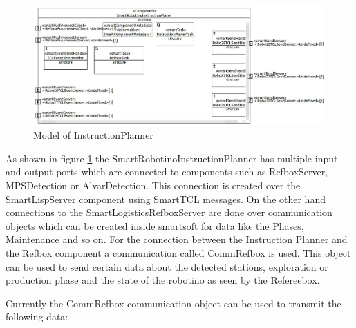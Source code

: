 \begin{figure}[h]
\centering
\includegraphics[scale=0.25]{pic/SmartRobotinoInstructionPlaner.JPG}
\caption{Model of InstructionPlanner}
\label{fig:i_overview}
\end{figure}


As shown in figure \ref{fig:i_overview} the SmartRobotinoInstructionPlanner has multiple input and output ports which are connected to components such as RefboxServer, MPSDetection or AlvarDetection. This connection is created over the SmartLispServer component using SmartTCL messages. On the other hand connections to the SmartLogisticsRefboxServer are done over communication objects which can be created inside smartsoft for data like the Phases, Maintenance and so on. For the connection between the Instruction Planner and the Refbox component a communication called CommRefbox is used. This object can be used to send certain data about the detected stations, exploration or production phase and the state of the robotino as seen by the 
Refereebox. \\

\newpage

Currently the CommRefbox communication object can be used to transmit the following data: 

